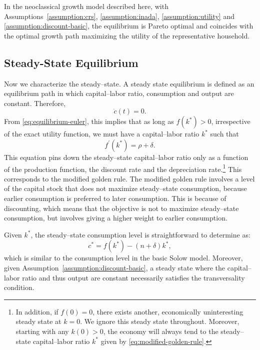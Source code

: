 \documentclass[\topdir/lecture\_notes.tex]{subfiles}
\begin{document}
\begin{proposition}\label{prop:welfare}
  In the neoclassical growth model described here, with Assumptions~\ref{assumption:crs}, \ref{assumption:inada}, \ref{assumption:utility} and \ref{assumption:discount-basic}, the equilibrium is Pareto optimal and coincides with the optimal growth path maximizing the utility of the representative household.
\end{proposition}

\subsection{Steady-State Equilibrium}
Now we characterize the steady--state.
A steady state equilibrium is defined as an equilibrium path in which capital--labor ratio, consumption and output are constant.
Therefore,
\[
  \dot{c}(t)=0.
\]
From \eqref{eq:equilibrium-euler}, this implies that as long as \(f\left(k^{*}\right)>0\), irrespective of the exact utility function, we must have a capital--labor ratio \(k^{*}\) such that
\begin{equation}
  f^{\prime}\left(k^{*}\right)=\rho+\delta.
  \label{eq:modified-golden-rule}
\end{equation}
This equation pins down the steady--state capital--labor ratio only as a function of the production function, the discount rate and the depreciation rate.\footnote{In addition, if \(f(0)=0\), there exists another, economically uninteresting steady state at \(k=0\). We ignore this steady state throughout. Moreover, starting with any \(k(0)>0\), the economy will always tend to the steady--state capital--labor ratio \(k^{*}\) given by \eqref{eq:modified-golden-rule}.} This corresponds to the modified golden rule. The modified golden rule involves a level of the capital stock that does not maximize steady--state consumption, because earlier consumption is preferred to later consumption. This is because of discounting, which means that the objective is not to maximize steady--state consumption, but involves giving a higher weight to earlier consumption.

Given \(k^{*}\), the steady--state consumption level is straightforward to determine as:
\begin{equation}
  c^{*}=f\left(k^{*}\right)-(n+\delta) k^{*},
  \label{eq:steady-consumption}
\end{equation}
which is similar to the consumption level in the basic Solow model. Moreover, given Assumption~\ref{assumption:discount-basic}, a steady state where the capital--labor ratio and thus output are constant necessarily satisfies the transversality condition.
\end{document}

